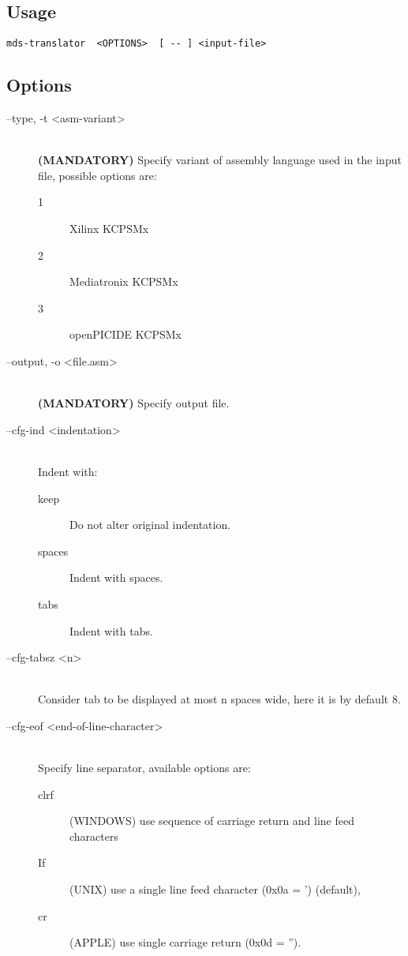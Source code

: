     \subsection{Usage}
        \verb'mds-translator  <OPTIONS>  [ -- ] <input-file>'

    \subsection{Options}
        \begin{description}
            \item[--type, -t <asm-variant>]~\\
                \textbf{(MANDATORY)} Specify variant of assembly language used in the input file, possible options are:
                \begin{description}
                    \item [1] Xilinx KCPSMx
                    \item [2] Mediatronix KCPSMx
                    \item [3] openPICIDE KCPSMx
                \end{description}

            \item[--output, -o <file.asm>]~\\
                \textbf{(MANDATORY)} Specify output file.

            \item[--cfg-ind <indentation>]~\\
                Indent with:
                \begin{description}
                    \item [keep] Do not alter original indentation.
                    \item [spaces] Indent with spaces.
                    \item [tabs] Indent with tabs.
                \end{description}

            \item[--cfg-tabsz <n>]~\\
                Consider tab to be displayed at most n spaces wide, here it is by default 8.

            \item[--cfg-eof <end-of-line-character>]~\\
                Specify line separator, available options are:
                \begin{description}
                    \item [clrf] (WINDOWS) use sequence of carriage return and line feed characters
                    \item [If] (UNIX) use a single line feed character (0x0a = ') (default),
                    \item [cr] (APPLE) use single carriage return (0x0d = '').
                \end{description}


\end{description}
